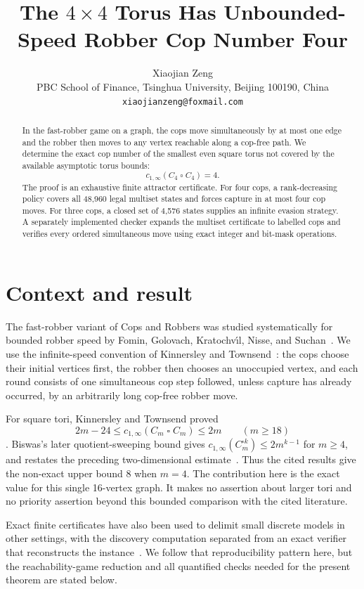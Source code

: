 \documentclass[11pt]{article}
\title{The $4\times4$ Torus Has Unbounded-Speed Robber Cop Number Four}
\author{Xiaojian Zeng\\
  \small PBC School of Finance, Tsinghua University, Beijing 100190, China\\
  \small \texttt{xiaojianzeng@foxmail.com}}
\date{}
\begin{document}
\maketitle

\begin{abstract}
In the fast-robber game on a graph, the cops move simultaneously by at most
one edge and the robber then moves to any vertex reachable along a cop-free
path.  We determine the exact cop number of the smallest even square torus not
covered by the available asymptotic torus bounds:
\[
  c_{1,\infty}(C_4\mathbin{\square}C_4)=4.
\]
The proof is an exhaustive finite attractor certificate.  For four cops, a
rank-decreasing policy covers all 48,960 legal multiset states and forces
capture in at most four cop moves.  For three cops, a closed set of 4,576
states supplies an infinite evasion strategy.  A separately implemented
checker expands the multiset certificate to labelled cops and verifies every
ordered simultaneous move using exact integer and bit-mask operations.
\end{abstract}

\section{Context and result}

The fast-robber variant of Cops and Robbers was studied systematically for
bounded robber speed by Fomin, Golovach, Kratochv\'{\i}l, Nisse, and
Suchan~\cite{FominEtAl2010}.  We use the infinite-speed convention of
Kinnersley and Townsend~\cite{KinnersleyTownsend2022}: the cops choose their
initial vertices first, the robber then chooses an unoccupied vertex, and each
round consists of one simultaneous cop step followed, unless capture has
already occurred, by an arbitrarily long cop-free robber move.

For square tori, Kinnersley and Townsend proved
\[
  2m-24\leq c_{1,\infty}(C_m\mathbin{\square}C_m)\leq 2m
  \qquad(m\geq18)
\]
\cite[Theorem~2.7]{KinnersleyTownsend2022}.  Biswas's later
quotient-sweeping bound gives
\(c_{1,\infty}(C_m^{\square k})\leq2m^{k-1}\) for \(m\geq4\),
and restates the preceding two-dimensional estimate~\cite[Section~5.2]
{Biswas2026}.  Thus the cited results give the non-exact upper bound $8$ when
\(m=4\).  The contribution here is the exact value for this single
16-vertex graph.  It makes no assertion about larger tori and no priority
assertion beyond this bounded comparison with the cited literature.

Exact finite certificates have also been used to delimit small discrete
models in other settings, with the discovery computation separated from an
exact verifier that reconstructs the instance~\cite[Sections~6--7]
{ZengEtAl2026Certificates}.  We follow that reproducibility pattern here, but
the reachability-game reduction and all quantified checks needed for the
present theorem are stated below.
\end{document}
